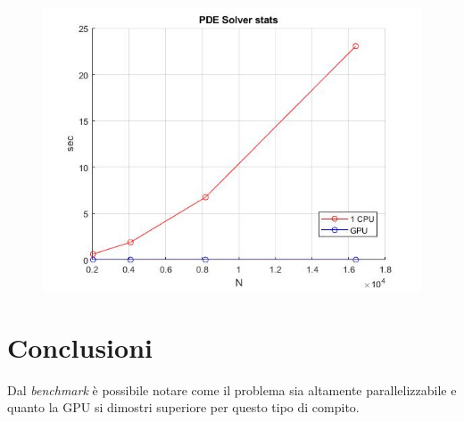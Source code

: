\documentclass[12pt]{article}
\begin{document}
\begin{figure}[H]
\includegraphics[width=\textwidth]{PDEStats.jpg}
\centering
\end{figure}


\section{Conclusioni}
Dal \emph{benchmark} è possibile notare come il problema sia altamente parallelizzabile e quanto la GPU si dimostri superiore per questo tipo di compito.
\end{document}
